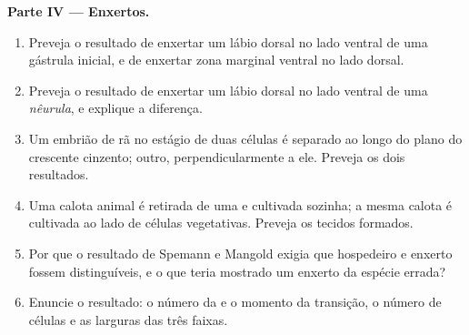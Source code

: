 \begin{problem}
\medskip
\noindent\textbf{Parte IV --- Enxertos.}
\begin{enumerate}[resume]
  \item Preveja o resultado de enxertar um lábio dorsal no lado ventral
        de uma gástrula inicial, e de enxertar zona marginal ventral no
        lado dorsal.
  \item Preveja o resultado de enxertar um lábio dorsal no lado ventral
        de uma \emph{nêurula}, e explique a diferença.
  \item Um embrião de rã no estágio de duas células é separado ao longo
        do plano do crescente cinzento; outro, perpendicularmente a ele.
        Preveja os dois resultados.
  \item Uma calota animal é retirada de uma  e cultivada
        sozinha; a mesma calota é cultivada ao lado de células
        vegetativas. Preveja os tecidos formados.
  \item Por que o resultado de Spemann e Mangold exigia que hospedeiro e
        enxerto fossem distinguíveis, e o que teria mostrado um enxerto
        da espécie errada?
  \item Enuncie o resultado: o número da  e o momento da
        transição, o número de células e as larguras das três faixas.
\end{enumerate}
\end{problem}
